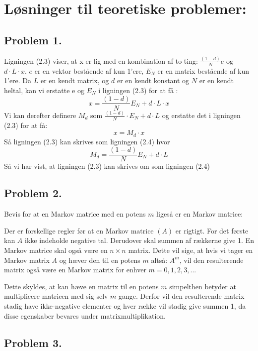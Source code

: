 
\section{Løsninger til teoretiske problemer:}


\subsection*{Problem 1.} \label{problem 1}

Ligningen (2.3) viser, at x er lig med en kombination af to ting: $\frac{(1-d)}{N}e$ og $d\cdot L\cdot x$. $e$ er en vektor bestående af kun 1'ere, $E_N$ er en matrix bestående af kun 1'ere.
Da $L$ er en kendt matrix, og $d$ er en kendt konstant og $N$ er en kendt heltal, kan vi erstatte e og $E_N$ i ligningen (2.3) for at få :
$$x = \frac{(1-d)}{N}E_N + d\cdot L\cdot x$$
Vi kan derefter definere $M_d$ som $\frac{(1-d)}{N} \cdot E_N + d \cdot L$ og erstatte det i ligningen (2.3) for at få:
$$x = M_d \cdot x$$
Så ligningen (2.3) kan skrives som ligningen (2.4) hvor $$M_d = \frac{(1-d)}{N}E_N + d \cdot L$$
Så vi har vist, at ligningen (2.3) kan skrives om som ligningen (2.4)



\subsection*{Problem 2.}

Bevis for at en Markov matrice med en potens $m$ ligeså er en Markov matrice:

Der er forskellige regler før at en Markov matrice $(A)$ er rigtigt. For det første kan $A$ ikke indeholde negative tal. Derudover skal summen af rækkerne give 1. En Markov matrice skal også være en $n \times n$ matrix. Dette vil sige, at hvis vi tager en Markov matrix $A$ og hæver den til en potens $m$ altså: $A^m$, vil den resulterende matrix også være en Markov matrix for enhver $m = 0,1,2,3,...$

Dette skyldes, at kan hæve en matrix til en potens $m$ simpelthen betyder at multiplicere matricen med sig selv $m$ gange. Derfor vil den resulterende matrix stadig have ikke-negative elementer og hver række vil stadig give summen 1, da disse egenskaber bevares under matrixmultiplikation.

\subsection*{Problem 3.}

